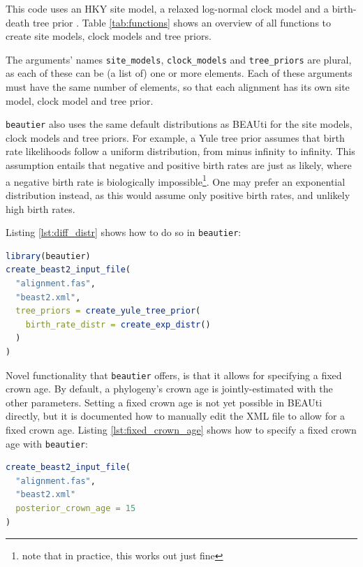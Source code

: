 \documentclass{article}
\begin{document}
This code uses an HKY site model, a relaxed log-normal clock model and a birth-death tree prior \cite{kendall1948generalized}.
Table \ref{tab:functions} shows an overview of all functions to create site models, clock models and tree priors.

The arguments' names \verb;site_models;, \verb;clock_models; and \verb;tree_priors; are plural, as each of these
can be (a list of) one or more elements. Each of these arguments must have the same number of elements, so that each alignment has its
own site model, clock model and tree prior. 

\verb;beautier; also uses the same default distributions as BEAUti for the site models, clock models and tree priors. 
For example, a Yule tree prior assumes that birth rate likelihoods follow a uniform distribution, from minus infinity to infinity. 
This assumption entails that negative and positive birth rates are just as likely, 
where a negative birth rate is biologically impossible\footnote{note that in practice, this works out just fine}.
One may prefer an exponential distribution instead, as this would assume only positive birth rates, 
and unlikely high birth rates.
 
Listing \ref{lst:diff_distr} shows how to do so in \verb;beautier;:

\begin{lstlisting}[language=R, caption=Example with Yule tree prior with different birth rate distribution, label=lst:diff_distr, floatplacement=H]
library(beautier)
create_beast2_input_file(
  "alignment.fas",
  "beast2.xml",
  tree_priors = create_yule_tree_prior(
    birth_rate_distr = create_exp_distr()    
  )
)
\end{lstlisting}

Novel functionality that \verb;beautier; offers, is that it allows for specifying a fixed crown age. 
By default, a phylogeny's crown age is jointly-estimated with the other parameters.
Setting a fixed crown age is not yet possible in BEAUti directly, but it is documented how to 
manually edit the XML file to allow for a fixed crown age. 
Listing \ref{lst:fixed_crown_age} shows how to specify a fixed crown age with \verb;beautier;:

\begin{lstlisting}[language=R, caption=Example with fixed crown age, label=lst:fixed_crown_age, floatplacement=H]
create_beast2_input_file(
  "alignment.fas",
  "beast2.xml"
  posterior_crown_age = 15
)
\end{lstlisting}
\end{document}
